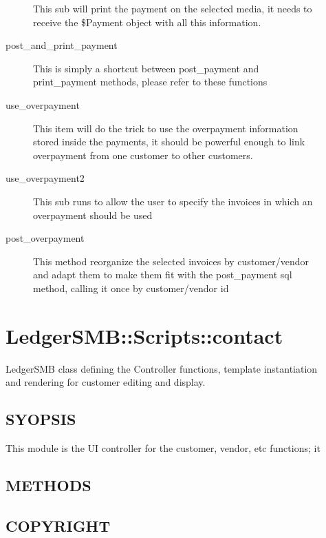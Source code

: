 \begin{description}
\begin{description}
This sub will print the payment on the selected media, it needs to
receive the \$Payment object with all this information.


\item[{post\_and\_print\_payment}] \mbox{}

This is simply a shortcut between post\_payment and print\_payment methods, please refer
to these functions


\item[{use\_overpayment}] \mbox{}

This item will do the trick to use the overpayment information stored inside the payments,
it should be powerful enough to link overpayment from one customer to other customers.


\item[{use\_overpayment2}] \mbox{}

This sub runs to allow the user to specify the invoices in which an overpayment should be used


\item[{post\_overpayment}] \mbox{}

This method reorganize the selected invoices by customer/vendor and adapt them to make them fit with the post\_payment sql method, calling it once by customer/vendor id

\end{description}
\section{LedgerSMB::Scripts::contact\label{LedgerSMB::Scripts::contact}}


LedgerSMB class defining the Controller
functions, template instantiation and rendering for customer editing and display.

\subsection*{SYOPSIS\label{LedgerSMB::Scripts::contact_SYOPSIS}}


This module is the UI controller for the customer, vendor, etc functions; it

\subsection*{METHODS\label{LedgerSMB::Scripts::contact_METHODS}}
\subsection*{COPYRIGHT\label{LedgerSMB::Scripts::contact_COPYRIGHT}}



\end{description}
